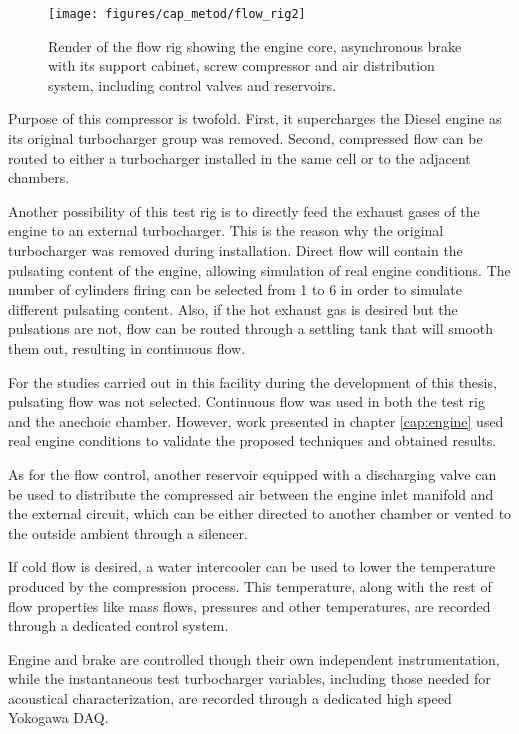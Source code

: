 \begin{figure}[b!]
\centering
\texttt{[image: figures/cap\_metod/flow\_rig2]}
\caption{Render of the flow rig showing the engine core, asynchronous brake with its support cabinet, screw compressor and air distribution system, including control valves and reservoirs.}
\label{fig:flowrig_render}
\end{figure}

Purpose of this compressor is twofold. First, it supercharges the Diesel engine as its original turbocharger group was removed. Second, compressed flow can be routed to either a turbocharger installed in the same cell or to the adjacent chambers.

Another possibility of this test rig is to directly feed the exhaust gases of the engine to an external turbocharger. This is the reason why the original turbocharger was removed during installation. Direct flow will contain the pulsating content of the engine, allowing simulation of real engine conditions.
The number of cylinders firing can be selected from 1 to 6 in order to simulate different pulsating content. Also, if the hot exhaust gas is desired but the pulsations are not, flow can be routed through a settling tank that will smooth them out, resulting in continuous flow.

For the studies carried out in this facility during the development of this thesis, pulsating flow was not selected. Continuous flow was used in both the test rig and the anechoic chamber. However, work presented in chapter \ref{cap:engine} used real engine conditions to validate the proposed techniques and obtained results.

As for the flow control, another reservoir equipped with a discharging valve can be used to distribute the compressed air between the engine inlet manifold and the external circuit, which can be either directed to another chamber or vented to the outside ambient through a silencer.

If cold flow is desired, a water intercooler can be used to lower the temperature produced by the compression process. This temperature, along with the rest of flow properties like mass flows, pressures and other temperatures, are recorded through a dedicated control system.

Engine and brake are controlled though their own independent instrumentation, while the instantaneous test turbocharger variables, including those needed for acoustical characterization, are recorded through a dedicated high speed Yokogawa DAQ.

